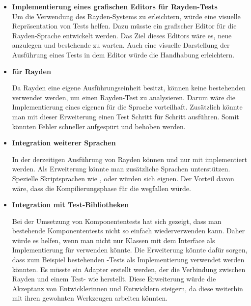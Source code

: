 \begin{itemize}
\item \textbf{Implementierung eines grafischen Editors für Rayden-Tests}\\

Um die Verwendung des Rayden-Systems zu erleichtern, würde eine visuelle Repräsentation von Tests helfen. Dazu müsste ein grafischer Editor für die Rayden-Sprache entwickelt werden. Das Ziel dieses Editors wäre es, neue  anzulegen und bestehende zu warten. Auch eine visuelle Darstellung der Ausführung eines Tests in dem Editor würde die Handhabung erleichtern.\\

\item \textbf{ für Rayden}

Da Rayden eine eigene Ausführungseinheit besitzt, können keine bestehenden  verwendet werden, um einen Rayden-Test zu analysieren. Darum wäre die Implementierung eines eigenen  für die Sprache vorteilhaft. Zusätzlich könnte man mit dieser Erweiterung einen Test Schritt für Schritt ausführen. Somit könnten Fehler schneller aufgespürt und behoben werden.\\

\item \textbf{Integration weiterer Sprachen}

In der derzeitigen Ausführung von Rayden können  und  nur mit  implementiert werden. Als Erweiterung könnte man zusätzliche Sprachen unterstützen. Spezielle Skriptsprachen wie ,  oder  würden sich eignen. Der Vorteil davon wäre, dass die Kompilierungsphase für die  wegfallen würde. \\

\item \textbf{Integration mit Test-Bibliotheken}

Bei der Umsetzung von Komponententests hat sich gezeigt, dass man bestehende Komponententests nicht so einfach wiederverwenden kann. Daher würde es helfen, wenn man nicht nur Klassen mit dem Interface  als Implementierung für  verwenden könnte. Die Erweiterung könnte dafür sorgen, dass zum Beispiel bestehenden -Tests als Implementierung verwendet werden könnten. Es müsste ein Adapter erstellt werden, der die Verbindung zwischen Rayden und einem Test- wie  herstellt. Diese Erweiterung würde die Akzeptanz von Entwicklerinnen und Entwicklern steigern, da diese weiterhin mit ihren gewohnten Werkzeugen arbeiten könnten. 

\end{itemize}

